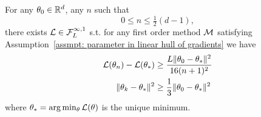 \begin{theorem}\label{thm: convex function complexity bound}
	For any \(\weights_0\in\reals^d\), any \(n\) such that 
	\[0\le n\le \tfrac12 (d-1),\]
	there exists \(\loss\in\lipGradientSet[\infty,1]{\ubound}\)
	s.t. for any first order method \(\firstOrderMethod\)
	satisfying Assumption~\ref{assmpt: parameter in linear hull of gradients}
	we have
	\begin{subequations}
	\begin{align}
		\loss(\weights_n) - \loss(\minimum)
		&\ge \frac{\ubound \|\weights_0 - \minimum\|^2}{16(n+1)^2} \\
		\|\weights_k -\minimum\|^2 
		&\ge \frac13 \|\weights_0 - \minimum\|^2
	\end{align}
	\end{subequations}
	where \(\minimum = \arg\min_\weights \loss(\weights)\) is the unique minimum.
\end{theorem}
